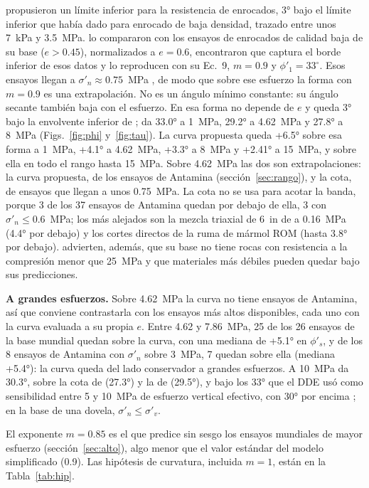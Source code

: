 \documentclass[11pt,letterpaper]{article}
\begin{document}
\citet[Fig.~13, p.~49]{indraratna1993} propusieron un límite inferior para la resistencia de enrocados, 3° bajo el límite inferior que \citet{leps} había dado para enrocado de baja densidad, trazado entre unos 7~kPa y 3.5~MPa. \citet[p.~13]{cylwik} lo compararon con los ensayos de enrocados de calidad baja de su base ($e > 0.45$), normalizados a $e = 0.6$, encontraron que captura el borde inferior de esos datos y lo reproducen con su Ec.~9, $m = 0.9$ y $\phi'_1 = 33^{\circ}$. Esos ensayos llegan a $\sigma'_n \approx 0.75$~MPa \citep[Fig.~19]{cylwik}, de modo que sobre ese esfuerzo la forma con $m = 0.9$ es una extrapolación. No es un ángulo mínimo constante: su ángulo secante también baja con el esfuerzo. En esa forma no depende de $e$ \citep[Tabla~1]{cylwik} y queda 3° bajo la envolvente inferior de \citet{leps}; da 33.0° a 1~MPa, 29.2° a 4.62~MPa y 27.8° a 8~MPa (Figs.~\ref{fig:phi} y~\ref{fig:tau}). La curva propuesta queda +6.5° sobre esa forma a 1~MPa, +4.1° a 4.62~MPa, +3.3° a 8~MPa y +2.41° a 15~MPa, y sobre ella en todo el rango hasta 15~MPa. Sobre 4.62~MPa las dos son extrapolaciones: la curva propuesta, de los ensayos de Antamina (sección~\ref{sec:rango}), y la cota, de ensayos que llegan a unos 0.75~MPa. La cota no se usa para acotar la banda, porque 3 de los 37 ensayos de Antamina quedan por debajo de ella, 3 con $\sigma'_n \le 0.6$~MPa; los más alejados son la mezcla triaxial de 6~in de \citet{g2021} a 0.16~MPa (4.4° por debajo) y los cortes directos de la ruma de mármol ROM (hasta 3.8° por debajo). \citet{cylwik} advierten, además, que su base no tiene rocas con resistencia a la compresión menor que 25~MPa y que materiales más débiles pueden quedar bajo sus predicciones.

\textbf{A grandes esfuerzos.} Sobre 4.62~MPa la curva no tiene ensayos de Antamina, así que conviene contrastarla con los ensayos más altos disponibles, cada uno con la curva evaluada a su propia $e$. Entre 4.62 y 7.86~MPa, 25 de los 26 ensayos de la base mundial quedan sobre la curva, con una mediana de +5.1° en $\phi'_s$, y de los 8 ensayos de Antamina con $\sigma'_n$ sobre 3~MPa, 7 quedan sobre ella (mediana +5.4°): la curva queda del lado conservador a grandes esfuerzos. A 10~MPa da 30.3°, sobre la cota de \citet{indraratna1993} (27.3°) y la de \citet{hc2017} (29.5°), y bajo los 33° que el DDE usó como sensibilidad entre 5 y 10~MPa de esfuerzo vertical efectivo, con 30° por encima \citep[§3.5.3.6, Tabla~3-24, nota~4]{stantec2026iff}; en la base de una dovela, $\sigma'_n \le \sigma'_v$.

El exponente $m = 0.85$ es el que predice sin sesgo los ensayos mundiales de mayor esfuerzo (sección~\ref{sec:alto}), algo menor que el valor estándar del modelo simplificado (0.9). Las hipótesis de curvatura, incluida $m = 1$, están en la Tabla~\ref{tab:hip}.
\end{document}
